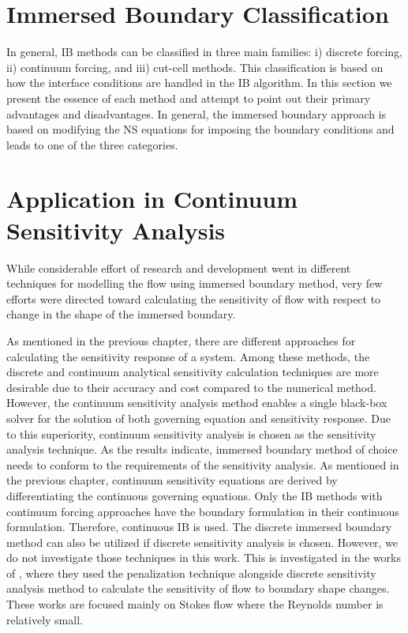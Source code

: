 \section{Immersed Boundary Classification}
In general, IB methods can be classified in three main families: i) discrete forcing, ii) continuum forcing, and iii) cut-cell methods. This classification is based on how the interface conditions are handled in the IB algorithm. In this section we present the essence of each method and attempt to point out their primary advantages and disadvantages. In general, the immersed boundary approach is based on modifying the NS equations for imposing the boundary conditions and leads to one of the three categories.


\section{Application in Continuum Sensitivity Analysis}
While considerable effort of research and development went in different techniques for modelling the flow using immersed boundary method, very few efforts were directed toward calculating the sensitivity of flow with respect to change in the shape of the immersed boundary.

As mentioned in the previous chapter, there are different approaches for calculating the sensitivity response of a system. Among these methods, the discrete and continuum analytical sensitivity calculation techniques are more desirable due to their accuracy and cost compared to the numerical method. However, the continuum sensitivity analysis method enables a single black-box solver for the solution of both governing equation and sensitivity response. Due to this superiority, continuum sensitivity analysis is chosen as the sensitivity analysis technique. As the results indicate, immersed boundary method of choice needs to conform to the requirements of the sensitivity analysis. As mentioned in the previous chapter, continuum sensitivity equations are derived by differentiating the continuous governing equations. Only the IB methods with continuum forcing approaches have the boundary formulation in their continuous formulation. Therefore, continuous IB is used. The discrete immersed boundary method can also be utilized if discrete sensitivity analysis is chosen. However, we do not investigate those techniques in this work. This is investigated in the works of \cite{kreissl2011explicit, borrvall2003topology, challis2009level}, where they used the penalization technique alongside discrete sensitivity analysis method to calculate the sensitivity of flow to boundary shape changes. These works are focused mainly on Stokes flow where the Reynolds number is relatively small.

